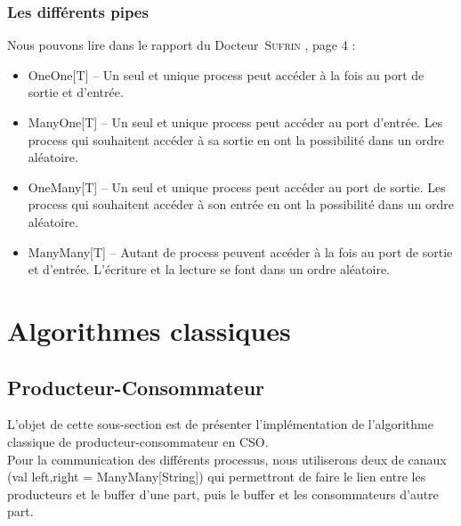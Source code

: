 \documentclass[a4paper,11pt,french]{report}
\begin{document}
\subsubsection{Les différents pipes}
Nous pouvons lire dans le rapport du Docteur~\textsc{Sufrin} \cite{cpa2008-cso}, page 4 :
\begin{itemize}
\renewcommand{\labelitemi}{$\diamond$}
\item \textsf{OneOne[T]} -- Un seul et unique process peut accéder à la fois au port de sortie et d'entrée.
\item \textsf{ManyOne[T]} -- Un seul et unique process peut accéder au port d'entrée. Les process qui souhaitent accéder à sa sortie en ont la possibilité dans un ordre aléatoire.
\item \textsf{OneMany[T]} -- Un seul et unique process peut accéder au port de sortie. Les process qui souhaitent accéder à son entrée en ont la possibilité dans un ordre aléatoire.
\item \textsf{ManyMany[T]} -- Autant de process peuvent accéder à la fois au port de sortie et d'entrée. L'écriture et la lecture se font dans un ordre aléatoire.
\end{itemize}

\section{Algorithmes classiques}
\subsection{Producteur-Consommateur}

L'objet de cette sous-section est de présenter l'implémentation de l'algorithme classique de producteur-consommateur en CSO.\\
Pour la communication des différents processus, nous utiliserons deux de canaux (\textsf{val left,right = ManyMany[String]}) qui permettront de faire le lien entre les producteurs et le buffer d'une part, puis le buffer et les consommateurs d'autre part.
\end{document}
